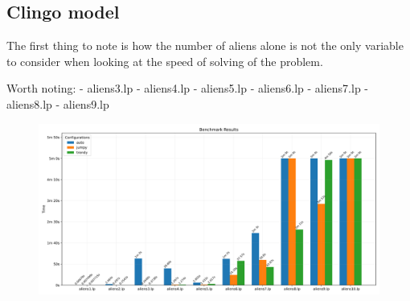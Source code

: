 \documentclass[11pt]{article}
\begin{document}
\subsection{Clingo model}

The first thing to note is how the number of aliens alone is not the only variable to consider when looking at the speed of solving of the problem.


Worth noting:
- aliens3.lp
- aliens4.lp
- aliens5.lp
- aliens6.lp
- aliens7.lp
- aliens8.lp
- aliens9.lp

\begin{figure}[h]
  \label{fig:clingo-bench-comparative}
  \centering
  \includegraphics[width=\textwidth]{./clingo/benchmarks/comparative.png}
\end{figure}
\end{document}

